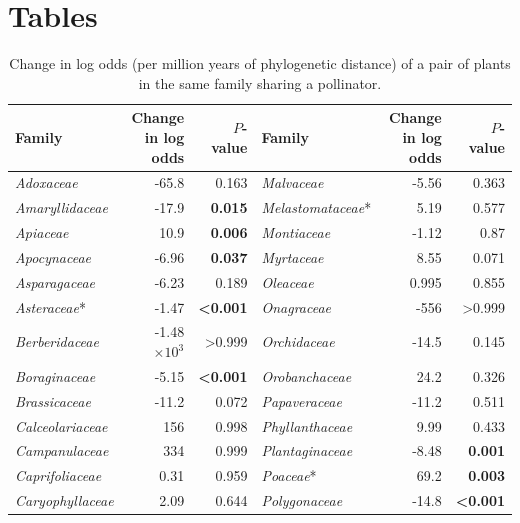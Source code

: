 \documentclass[12pt]{article}
\begin{document}
\newpage

\renewcommand*{\bibfont}{\raggedright}



\newpage
\section*{Tables}

  \begin{table}[!h]
  \caption{
  \small Change in log odds (per million years of phylogenetic distance) of a pair of plants in the same family sharing a pollinator.}
  \small
  \label{family_slopes_pp}
  \begin{tabular}{|l  rr|| l rr|}
    \hline
    Family  & Change in log odds & $P$-value & Family  & Change in log odds & $P$-value \\
    \hline
    \emph{Adoxaceae}  & -65.8 & 0.163 & \emph{Malvaceae}  & -5.56 & 0.363 \\
    \emph{Amaryllidaceae} & -17.9 & \textbf{0.015}  & \emph{Melastomataceae}* & 5.19  & 0.577 \\
    \emph{Apiaceae} & 10.9  & \textbf{0.006}  & \emph{Montiaceae} & -1.12 & 0.87  \\
    \emph{Apocynaceae}  & -6.96 & \textbf{0.037}  & \emph{Myrtaceae}  & 8.55  & 0.071 \\
    \emph{Asparagaceae} & -6.23 & 0.189 & \emph{Oleaceae} & 0.995 & 0.855 \\
    \emph{Asteraceae}*  & -1.47 & \textbf{\textless0.001} & \emph{Onagraceae} & -556  & \textgreater0.999 \\
    \emph{Berberidaceae}  & -1.48$\times10^3$ & \textgreater0.999 & \emph{Orchidaceae}  & -14.5 & 0.145 \\
    \emph{Boraginaceae} & -5.15 & \textbf{\textless0.001} & \emph{Orobanchaceae}  & 24.2  & 0.326 \\
    \emph{Brassicaceae} & -11.2 & 0.072 & \emph{Papaveraceae} & -11.2 & 0.511 \\
    \emph{Calceolariaceae}  & 156 & 0.998 & \emph{Phyllanthaceae} & 9.99  & 0.433 \\
    \emph{Campanulaceae}  & 334 & 0.999 & \emph{Plantaginaceae} & -8.48 & \textbf{0.001}  \\
    \emph{Caprifoliaceae} & 0.31  & 0.959 & \emph{Poaceae}* & 69.2  & \textbf{0.003}  \\
    \emph{Caryophyllaceae}  & 2.09  & 0.644 & \emph{Polygonaceae} & -14.8 & \textbf{\textless0.001} \\

\end{tabular}
\end{table}
\end{document}
